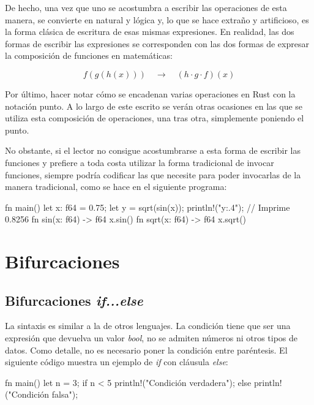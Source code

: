 De hecho, una vez que uno se acostumbra a escribir las operaciones de esta manera, se convierte en natural y lógica y, lo que se hace extraño y artificioso, es la forma clásica de escritura de esas mismas expresiones. En realidad, las dos formas de escribir las expresiones se corresponden con las dos formas de expresar la composición de funciones en matemáticas:

\[f(g(h(x)))  \quad \rightarrow \quad (h \cdot g \cdot f) (x) \]

Por último, hacer notar cómo se encadenan varias operaciones en Rust con la notación punto. A lo largo de este escrito se verán otras ocasiones en las que se utiliza esta composición de operaciones, una tras otra, simplemente poniendo el punto.

No obstante, si el lector no consigue acostumbrarse a esta forma de escribir las funciones y prefiere a toda costa utilizar la forma tradicional de invocar funciones, siempre podría codificar las que necesite para poder invocarlas de la manera tradicional, como se hace en el siguiente programa:

\vspace{0.7em}
\begin{Codigo}
fn main() {
   let x: f64 = 0.75;
   let y = sqrt(sin(x));
   println!("{y:.4}"); // Imprime 0.8256
}
fn sin(x: f64) -> f64 {
   x.sin()
}
fn sqrt(x: f64) -> f64 {
   x.sqrt()
}
\end{Codigo}


\section{Bifurcaciones}
\label{sec_bifurcaciones}

\subsection{Bifurcaciones \textit{if...else}}
\noindent La sintaxis es similar a la de otros lenguajes. La condición tiene que ser una expresión que devuelva un valor \textit{bool}, no se admiten números ni otros tipos de datos. Como detalle, no es necesario poner la condición entre paréntesis. El siguiente código muestra un ejemplo de \textit{if} con cláusula \textit{else}:

\vspace{0.7em}
\begin{Codigo}
fn main() {
   let n = 3;
   if n < 5 {
      println!("Condición verdadera");
   } else {
      println!("Condición falsa");
   }
}
\end{Codigo}

